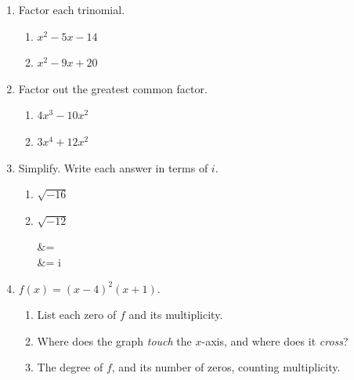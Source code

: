 \documentclass[10pt]{article}
\begin{document}

\vspace{0.12in}

\begin{enumerate}[itemsep=20pt]

\item Factor each trinomial.

\begin{enumerate}[label=(\alph*), itemsep=30pt]
  \item $x^2 - 5x - 14$ \hfill \blank{3.4cm}
  \item $x^2 - 9x + 20$ \hfill \blank{3.4cm}
\end{enumerate}

\item Factor out the greatest common factor.

\begin{enumerate}[label=(\alph*), itemsep=30pt]
  \item $4x^3 - 10x^2$ \hfill \blank{3.4cm}
  \item $3x^4 + 12x^2$ \hfill \blank{3.4cm}
\end{enumerate}

\item Simplify. Write each answer in terms of $i$.

\begin{enumerate}[label=(\alph*), itemsep=30pt]
  \item $\sqrt{-16}$ \hfill \blank{2.2cm}
  \item $\sqrt{-12}$

\begin{work}
   &= \cdot{}\cdot{} \\
             &= i  \cdot {}
\end{work}

  \hfill \blank{2.2cm}
\end{enumerate}

\item $f(x) = (x - 4)^2(x + 1)$.

\begin{enumerate}[label=(\alph*), itemsep=30pt]
  \item List each zero of $f$ and its multiplicity. \hfill \blank{4.8cm}
  \item Where does the graph \emph{touch} the $x$-axis, and where does it \emph{cross}? \hfill \blank{4.8cm}
  \item The degree of $f$, and its number of zeros, counting multiplicity. \hfill \blank{4.8cm}
\end{enumerate}

\end{enumerate}
\end{document}
